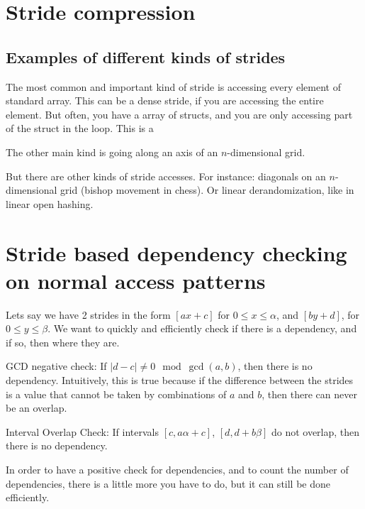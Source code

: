 \documentclass[12pt,twoside]{reedthesis}
\begin{document}


	\section{Stride compression}

		\subsection{Examples of different kinds of strides}
		The most common and important kind of stride is accessing every element of standard array. This can be a dense stride, if you are accessing the entire element. But often, you have a array of structs, and you are only accessing part of the struct in the loop. This is a $ $

		The other main kind is going along an axis of an $n$-dimensional grid.

		But there are other kinds of stride accesses. For instance: diagonals on an $n$-dimensional grid (bishop movement in chess). Or linear derandomization, like in linear open hashing.

	\section{Stride based dependency checking on normal access patterns}

		Lets say we have 2 strides in the form $[ax+c]$ for $0\le x \le \alpha$, and $[by+d]$, for $0 \le y \le \beta$. We want to quickly and efficiently check if there is a dependency, and if so, then where they are.

		GCD negative check: If $|d-c| \ne 0 \mod \gcd(a,b)$, then there is no dependency. Intuitively, this is true because if the difference between the strides is a value that cannot be taken by combinations of $a$ and $b$, then there can never be an overlap.

		Interval Overlap Check: If intervals $[c,a\alpha+c]$, $[d,d+b\beta]$ do not overlap, then there is no dependency.

		In order to have a positive check for dependencies, and to count the number of dependencies, there is a little more you have to do, but it can still be done efficiently.
\end{document}
